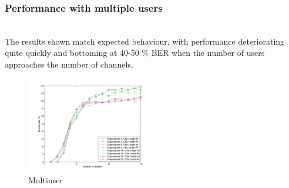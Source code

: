 		\subsubsection{Performance with multiple users}~\\
		
		The results shown match expected behaviour, with performance deteriorating quite quickly and bottoming at 40-50 \% BER when the number of users approaches the number of channels.
		\begin{figure}[H]
			\includegraphics[width=0.5\textwidth]{imgs/results/plot_mode_fhss-test_numSenders-rep_20-dataRate_8-dataLength_128.png}
			\caption{Multiuser}
			\label{fig:fhss_multiuser}
		\end{figure}